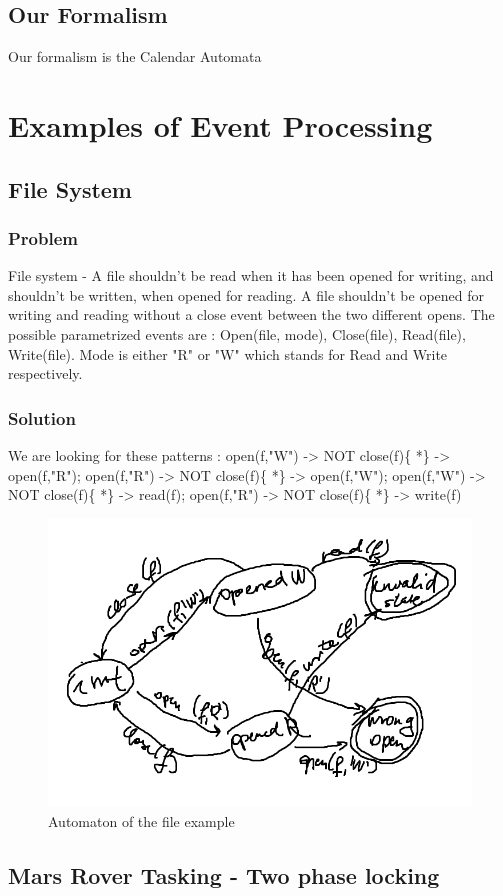 		\subsection{Our Formalism}
			Our formalism is the Calendar Automata
	\section{Examples of Event Processing}
 
		\subsection{File System}
			\subsubsection{Problem}
				File system - A file shouldn't be read when it has been opened for writing, and shouldn't be written, when opened for reading. 
				A file shouldn't be opened for writing and reading without a close event between the two different opens.
				The possible parametrized events are : Open(file, mode), Close(file), Read(file), Write(file). Mode is either "R" or "W" which stands for Read and Write respectively.
			\subsubsection{Solution}
				We are looking for these patterns : open(f,"W") -> NOT close(f)\{ *\} -> open(f,"R"); open(f,"R") -> NOT close(f)\{ *\} -> open(f,"W");
				open(f,"W") -> NOT close(f)\{ *\} -> read(f); open(f,"R") -> NOT close(f)\{ *\} -> write(f)
				\begin{figure}[h]
				\centering
				\includegraphics[width=0.5\linewidth]{include/figures/chapter_5/fileautomaton}
				\caption{Automaton of the file example}
				\label{fig:cep:fileautomaton}
				\end{figure}

		
		
		\subsection{Mars Rover Tasking - Two phase locking}
